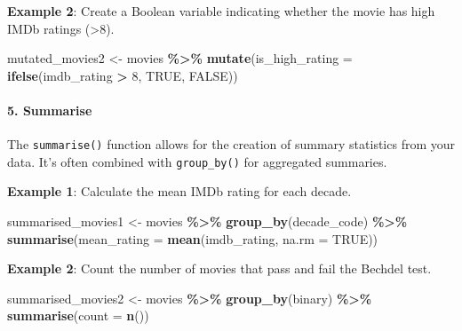 \documentclass[
]{book}
\newenvironment{Shaded}{\begin{snugshade}}{\end{snugshade}}
\newcommand{\AttributeTok}[1]{\textcolor[rgb]{0.13,0.29,0.53}{#1}}
\newcommand{\ConstantTok}[1]{\textcolor[rgb]{0.56,0.35,0.01}{#1}}
\newcommand{\DecValTok}[1]{\textcolor[rgb]{0.00,0.00,0.81}{#1}}
\newcommand{\FunctionTok}[1]{\textcolor[rgb]{0.13,0.29,0.53}{\textbf{#1}}}
\newcommand{\NormalTok}[1]{#1}
\newcommand{\OtherTok}[1]{\textcolor[rgb]{0.56,0.35,0.01}{#1}}
\newcommand{\SpecialCharTok}[1]{\textcolor[rgb]{0.81,0.36,0.00}{\textbf{#1}}}
\begin{document}
\textbf{Example 2}: Create a Boolean variable indicating whether the movie has high IMDb ratings (\textgreater8).

\begin{Shaded}
\begin{Highlighting}[]
\NormalTok{mutated\_movies2 }\OtherTok{\textless{}{-}}\NormalTok{ movies }\SpecialCharTok{\%\textgreater{}\%}
  \FunctionTok{mutate}\NormalTok{(}\AttributeTok{is\_high\_rating =} \FunctionTok{ifelse}\NormalTok{(imdb\_rating }\SpecialCharTok{\textgreater{}} \DecValTok{8}\NormalTok{, }\ConstantTok{TRUE}\NormalTok{, }\ConstantTok{FALSE}\NormalTok{))}
\end{Highlighting}
\end{Shaded}

\paragraph*{5. Summarise}\label{summarise}

The \texttt{summarise()} function allows for the creation of summary statistics from your data. It's often combined with \texttt{group\_by()} for aggregated summaries.

\textbf{Example 1}: Calculate the mean IMDb rating for each decade.

\begin{Shaded}
\begin{Highlighting}[]
\NormalTok{summarised\_movies1 }\OtherTok{\textless{}{-}}\NormalTok{ movies }\SpecialCharTok{\%\textgreater{}\%}
  \FunctionTok{group\_by}\NormalTok{(decade\_code) }\SpecialCharTok{\%\textgreater{}\%}
  \FunctionTok{summarise}\NormalTok{(}\AttributeTok{mean\_rating =} \FunctionTok{mean}\NormalTok{(imdb\_rating, }\AttributeTok{na.rm =} \ConstantTok{TRUE}\NormalTok{))}
\end{Highlighting}
\end{Shaded}

\textbf{Example 2}: Count the number of movies that pass and fail the Bechdel test.

\begin{Shaded}
\begin{Highlighting}[]
\NormalTok{summarised\_movies2 }\OtherTok{\textless{}{-}}\NormalTok{ movies }\SpecialCharTok{\%\textgreater{}\%}
  \FunctionTok{group\_by}\NormalTok{(binary) }\SpecialCharTok{\%\textgreater{}\%}
  \FunctionTok{summarise}\NormalTok{(}\AttributeTok{count =} \FunctionTok{n}\NormalTok{())}
\end{Highlighting}
\end{Shaded}
\end{document}
